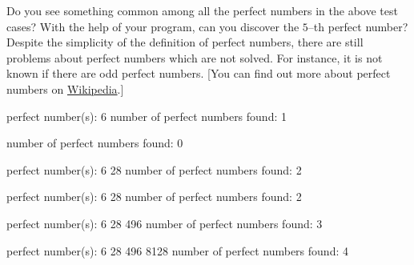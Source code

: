Do you see something common among all the perfect numbers in the above test
cases? With the help of your program, can you discover the $5$--th perfect
number? Despite the simplicity of the definition of perfect numbers, there are
still problems about perfect numbers which are not solved. For instance, it is
not known if there are odd perfect numbers. [You can find out more about
perfect numbers on \href{http://www.en.wikipedia.org}{Wikipedia}.]

\resett
\nextt
\begin{console}[frame=single, commandchars=\\\{\}]
perfect number(s): 6
number of perfect numbers found: 1
\end{console}

\nextt
\begin{console}[frame=single, commandchars=\\\{\}]
number of perfect numbers found: 0
\end{console}

\nextt
\begin{console}[frame=single, commandchars=\\\{\}]
perfect number(s): 6 28
number of perfect numbers found: 2
\end{console}

\nextt
\begin{console}[frame=single, commandchars=\\\{\}]
perfect number(s): 6 28
number of perfect numbers found: 2
\end{console}

\nextt
\begin{console}[frame=single, commandchars=\\\{\}]
perfect number(s): 6 28 496
number of perfect numbers found: 3
\end{console}

\nextt
\begin{console}[frame=single, commandchars=\\\{\}]
perfect number(s): 6 28 496 8128
number of perfect numbers found: 4
\end{console}
